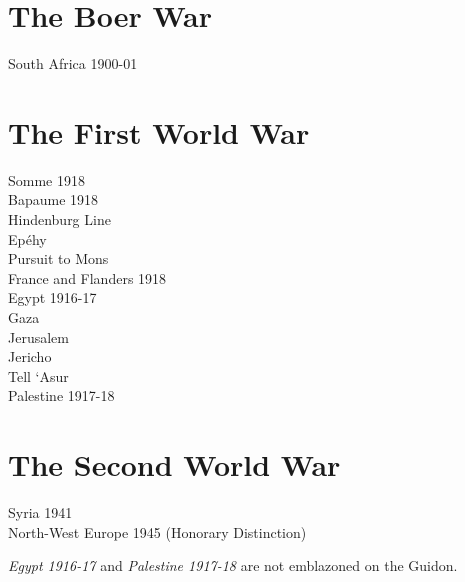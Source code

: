\section*{The Boer War}

\begin{center}
  South Africa 1900-01
\end{center}

\section*{The First World War}

\begin{center}
  Somme 1918 \\
  Bapaume 1918 \\
  Hindenburg Line \\
  Epéhy \\
  Pursuit to Mons \\
  France and Flanders 1918 \\
  Egypt 1916-17 \\
  Gaza \\
  Jerusalem \\
  Jericho \\
  Tell ‘Asur \\
  Palestine 1917-18
\end{center}

\section*{The Second World War}

\begin{center}
  Syria 1941 \\
  North-West Europe 1945 (Honorary Distinction)
\end{center}

\vspace{1.5cm}

\begin{center}
\noindent
\emph{Egypt 1916-17} and \emph{Palestine 1917-18} are not emblazoned on the Guidon.
\end{center}



